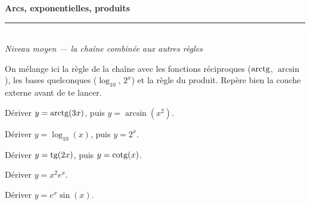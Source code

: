 \pagestyle{fancy}\fancyhf{}
\fancyfoot[C]{\small\thepage}
\renewcommand{\headrulewidth}{0.8pt}



\begin{center}
{\LARGE\bfseries\color{primarydark} Arcs, exponentielles, produits}\\[2pt]
{\color{primary}\rule{0.5\textwidth}{1.2pt}}\\[4pt]
{\small\itshape Niveau moyen — la chaîne combinée aux autres règles}
\end{center}
\vspace{2mm}

\begin{cle}[consigne]
On mélange ici la règle de la chaîne avec les fonctions réciproques ($\operatorname{arctg}$, $\arcsin$),
les bases quelconques ($\log_{10}$, $2^x$) et la règle du produit. Repère bien la couche
externe avant de te lancer.
\end{cle}

\begin{exo}
Dériver $y=\operatorname{arctg}(3x)$, puis $y=\arcsin(x^2)$.
\end{exo}

\begin{exo}
Dériver $y=\log_{10}(x)$, puis $y=2^{x}$.
\end{exo}

\begin{exo}
Dériver $y=\operatorname{tg}(2x)$, puis $y=\operatorname{cotg}(x)$.
\end{exo}

\begin{exo}
Dériver $y=x^2 e^{x}$.
\end{exo}

\begin{exo}
Dériver $y=e^{x}\sin(x)$.
\end{exo}


